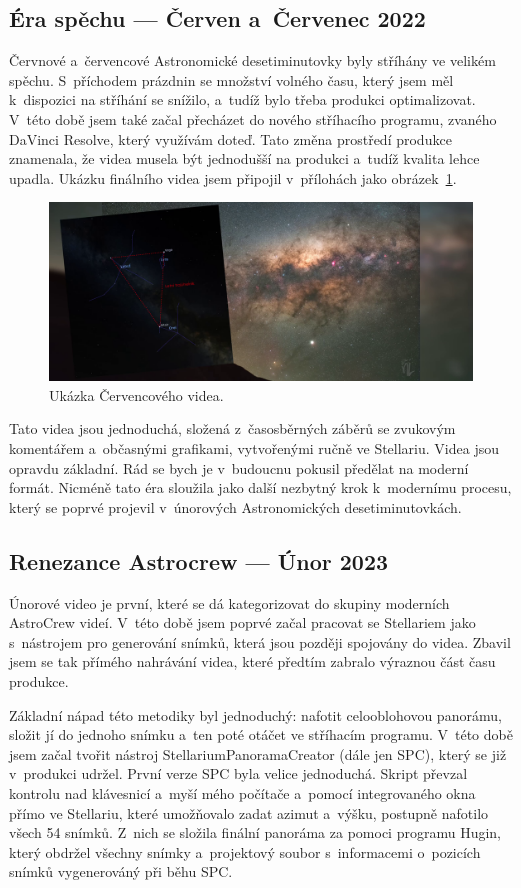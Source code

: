 \documentclass[12pt,a4paper,titlepage]{article}
\begin{document}
\subsection{Éra spěchu --- Červen a~Červenec 2022}
Červnové a~červencové Astronomické desetiminutovky byly stříhány ve velikém spěchu. S~příchodem prázdnin se množství volného času, který jsem měl k~dispozici na stříhání se snížilo, a~tudíž bylo třeba produkci optimalizovat. V~této době jsem také začal přecházet do nového stříhacího programu, zvaného DaVinci Resolve, který využívám doteď. Tato změna prostředí produkce znamenala, že videa musela být jednodušší na produkci a~tudíž kvalita lehce upadla. Ukázku finálního videa jsem připojil v~přílohách jako obrázek~\ref{img:cervenec}.

\begin{figure}[H]
	\centering
	\includegraphics[width=.85\textwidth]{cervenec.png}
	\caption{Ukázka Červencového videa.}\label{img:cervenec}
\end{figure}

Tato videa jsou jednoduchá, složená z~časosběrných záběrů se zvukovým komentářem a~občasnými grafikami, vytvořenými ručně ve Stellariu. Videa jsou opravdu základní. Rád se bych je v~budoucnu pokusil předělat na moderní formát. Nicméně tato éra sloužila jako další nezbytný krok k~modernímu procesu, který se poprvé projevil v~únorových Astronomických desetiminutovkách.
\subsection{Renezance Astrocrew --- Únor 2023}
Únorové video je první, které se dá kategorizovat do skupiny moderních AstroCrew videí. V~této době jsem poprvé začal pracovat se Stellariem jako s~nástrojem pro generování snímků, která jsou později spojovány do videa. Zbavil jsem se tak přímého nahrávání videa, které předtím zabralo výraznou část času produkce.

Základní nápad této metodiky byl jednoduchý: nafotit celooblohovou panorámu, složit jí do jednoho snímku a~ten poté otáčet ve stříhacím programu. V~této době jsem začal tvořit nástroj StellariumPanoramaCreator (dále jen SPC), který se již v~produkci udržel. První verze SPC byla velice jednoduchá. Skript převzal kontrolu nad klávesnicí a~myší mého počítače a~pomocí integrovaného okna přímo ve Stellariu, které umožňovalo zadat azimut a~výšku, postupně nafotilo všech 54 snímků. Z~nich se složila finální panoráma za pomoci programu Hugin, který obdržel všechny snímky a~projektový soubor s~informacemi o~pozicích snímků vygenerováný při běhu SPC.\@
\end{document}
